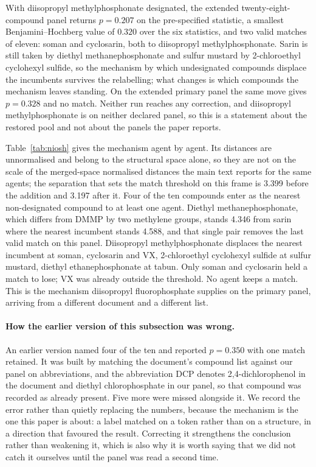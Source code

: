 \documentclass[11pt,a4paper]{article}
\begin{document}
With diisopropyl methylphosphonate designated, the extended twenty-eight-compound
panel returns $p = 0.207$ on the pre-specified statistic, a smallest
Benjamini--Hochberg value of $0.320$ over the six statistics, and two valid
matches of eleven: soman and cyclosarin, both to diisopropyl
methylphosphonate. Sarin is still taken by diethyl methanephosphonate and
sulfur mustard by 2-chloroethyl cyclohexyl sulfide, so the mechanism by which
undesignated compounds displace the incumbents survives the relabelling; what
changes is which compounds the mechanism leaves standing. On the extended
primary panel the same move gives $p = 0.328$ and no match. Neither run reaches
any correction, and diisopropyl methylphosphonate is on neither declared panel,
so this is a statement about the restored pool and not about the panels the
paper reports.

Table~\ref{tab:niosh} gives the mechanism agent by agent. Its distances are
unnormalised and belong to the structural space alone, so they are not on the
scale of the merged-space normalised distances the main text reports for the
same agents; the separation that sets the match threshold on this frame is
3.399 before the addition and 3.197 after it. Four of the ten compounds enter as
the nearest non-designated compound to at least one agent. Diethyl
methanephosphonate, which differs from DMMP by two methylene groups, stands
4.346 from sarin where the nearest incumbent stands 4.588, and that single pair
removes the last valid match on this panel. Diisopropyl methylphosphonate displaces the
nearest incumbent at soman, cyclosarin and VX, 2-chloroethyl cyclohexyl
sulfide at sulfur mustard, diethyl ethanephosphonate at tabun. Only soman and
cyclosarin held a match to lose; VX was already outside the threshold. No agent keeps a match.
This is the mechanism diisopropyl fluorophosphate supplies on the primary panel,
arriving from a different document and a different list.

\paragraph{How the earlier version of this subsection was wrong.} An earlier
version named four of the ten and reported $p = 0.350$ with one match retained.
It was built by matching the document's compound list against our panel on
abbreviations, and the abbreviation DCP denotes 2,4-dichlorophenol in the
document and diethyl chlorophosphate in our panel, so that compound was recorded
as already present. Five more were missed alongside it. We record the error
rather than quietly replacing the numbers, because the mechanism is the one this
paper is about: a label matched on a token rather than on a structure, in a
direction that favoured the result. Correcting it strengthens the conclusion
rather than weakening it, which is also why it is worth saying that we did not
catch it ourselves until the panel was read a second time.
\end{document}

